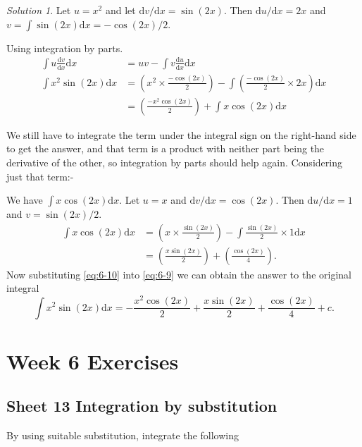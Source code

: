 \documentclass[
  english,
  11pt,
  oneside]{book}
\newcommand{\slide}{}
\theoremstyle{definition}
\theoremstyle{definition}
\theoremstyle{definition}
\theoremstyle{definition}
\theoremstyle{remark}
\newtheorem*{solution}{Solution}
\begin{document}
\begin{solution}
Let \(u = x^2\) and let \(\mathrm{d}v/\mathrm{d}x = \sin(2x)\). Then \(\mathrm{d}u/\mathrm{d}x = 2x\) and \(v = \displaystyle\int \sin(2x)\mathrm{d}x = -\cos(2x)/2\).

Using integration by parts.
\begin{align}
\int u\frac{\mathrm{d}v}{\mathrm{d}x}\mathrm{d}x& = uv-\int v\frac{\mathrm{d}u}{\mathrm{d}x}\mathrm{d}x\\
\int x^2\sin(2x)\mathrm{d}x&=\left(x^2\times\frac{-\cos(2x)}{2}\right)-\int\left(\frac{-\cos(2x)}{2}\times2x\right)\mathrm{d}x\\
&=\left(\frac{-x^2\cos(2x)}{2}\right)+\int x\cos(2x)\mathrm{d}x
\label{eq:6-9}
\end{align}

We still have to integrate the term under the integral sign on the right-hand side to get the answer, and that term is a product with neither part being the derivative of the other, so integration by parts should help again. Considering just that term:-

\slide

We have \(\displaystyle\int x\cos(2x)\mathrm{d}x\). Let \(u=x\) and \(\mathrm{d}v/\mathrm{d}x = \cos(2x)\). Then \(\mathrm{d}u/\mathrm{d}x = 1\) and \(v=\sin(2x)/2\).
\begin{align}
\int x\cos(2x)\mathrm{d}x &= \left(x\times\frac{\sin(2x)}{2}\right) - \int\frac{\sin(2x)}{2}\times1\mathrm{d}x\\
&= \left(\frac{x\sin(2x)}2\right)+\left(\frac{\cos(2x)}4\right).
\label{eq:6-10}
\end{align}
Now substituting \eqref{eq:6-10} into \eqref{eq:6-9} we can obtain the answer to the original integral
\[\int x^2\sin(2x)\mathrm{d}x = -\frac{x^2\cos(2x)}2+\frac{x\sin(2x)}2+\frac{\cos(2x)}4 + c.\]
\end{solution}

\chapter*{Week 6 Exercises}\label{week-6-exercises}

\section{Sheet 13 Integration by substitution}\label{sheet-13-integration-by-substitution}

By using suitable substitution, integrate the following
\end{document}
